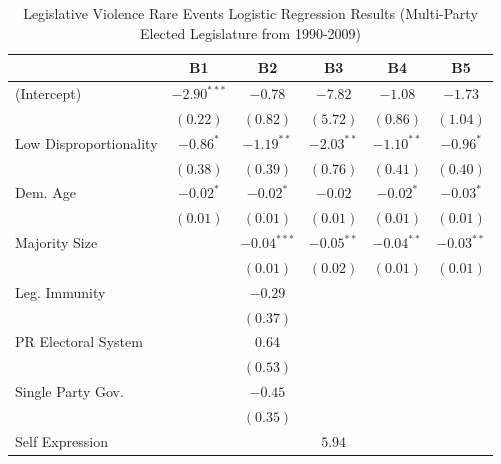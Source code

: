 \documentclass[a4paper]{article}\usepackage{graphicx, color}
\begin{document}
\begin{table}
\caption{Legislative Violence Rare Events Logistic Regression Results (Multi-Party Elected Legislature from 1990-2009)}
\label{outputTable.1990}
\begin{center}

\begin{tabular}{l c c c c c }
\hline
                       & B1 & B2 & B3 & B4 & B5 \\
\hline
(Intercept)            & $-2.90^{***}$ & $-0.78$       & $-7.82$      & $-1.08$      & $-1.73$      \\
                       & $(0.22)$      & $(0.82)$      & $(5.72)$     & $(0.86)$     & $(1.04)$     \\
Low Disproportionality & $-0.86^{*}$   & $-1.19^{**}$  & $-2.03^{**}$ & $-1.10^{**}$ & $-0.96^{*}$  \\
                       & $(0.38)$      & $(0.39)$      & $(0.76)$     & $(0.41)$     & $(0.40)$     \\
Dem. Age               & $-0.02^{*}$   & $-0.02^{*}$   & $-0.02$      & $-0.02^{*}$  & $-0.03^{*}$  \\
                       & $(0.01)$      & $(0.01)$      & $(0.01)$     & $(0.01)$     & $(0.01)$     \\
Majority Size          &               & $-0.04^{***}$ & $-0.05^{**}$ & $-0.04^{**}$ & $-0.03^{**}$ \\
                       &               & $(0.01)$      & $(0.02)$     & $(0.01)$     & $(0.01)$     \\
Leg. Immunity          &               & $-0.29$       &              &              &              \\
                       &               & $(0.37)$      &              &              &              \\
PR Electoral System    &               & $0.64$        &              &              &              \\
                       &               & $(0.53)$      &              &              &              \\
Single Party Gov.      &               & $-0.45$       &              &              &              \\
                       &               & $(0.35)$      &              &              &              \\
Self Expression        &               &               & $5.94$       &              &              \\

\end{tabular}
\end{center}
\end{table}
\end{document}
